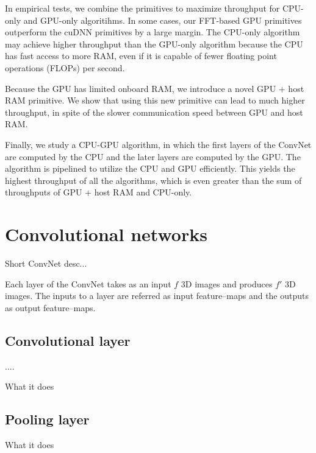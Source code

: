 \documentclass[conference]{./IEEEtran/IEEEtran}
\begin{document}
In empirical tests, we combine the primitives to maximize throughput
for CPU-only and GPU-only algoritihms. In some cases, our FFT-based
GPU primitives outperform the cuDNN primitives by a large margin.  The
CPU-only algorithm may achieve higher throughput than the GPU-only
algorithm because the CPU has fast access to more RAM, even if it is
capable of fewer floating point operations (FLOPs) per second.

Because the GPU has limited onboard RAM, we introduce a novel GPU +
host RAM primitive.  We show that using this new primitive can lead to
much higher throughput, in spite of the slower communication speed
between GPU and host RAM.

Finally, we study a CPU-GPU algorithm, in which the first layers of
the ConvNet are computed by the CPU and the later layers are computed
by the GPU.  The algorithm is pipelined to utilize the CPU and GPU
efficiently.  This yields the highest throughput of all the
algorithms, which is even greater than the sum of throughputs of GPU +
host RAM and CPU-only.



\section{Convolutional networks}

  Short ConvNet desc...

  Each layer of the ConvNet takes as an input $f$ 3D images and
  produces $f'$ 3D images.  The inputs to a layer are referred as
  input feature--maps and the outputs as output feature--maps.

\subsection{Convolutional layer}

  ....

  What it does

\subsection{Pooling layer}

  What it does
\end{document}
